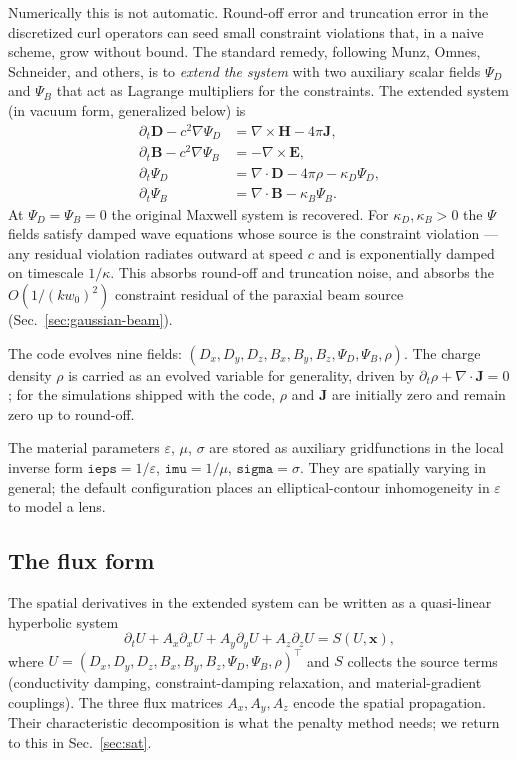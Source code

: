 \documentclass[11pt]{article}
\newcommand{\vE}{\mathbf{E}}
\newcommand{\vB}{\mathbf{B}}
\newcommand{\vD}{\mathbf{D}}
\newcommand{\vH}{\mathbf{H}}
\newcommand{\vJ}{\mathbf{J}}
\newcommand{\vx}{\mathbf{x}}
\newcommand{\eps}{\varepsilon}
\begin{document}
Numerically this is not automatic. Round-off error and truncation error
in the discretized curl operators can seed small constraint violations
that, in a naive scheme, grow without bound. The standard remedy,
following Munz, Omnes, Schneider, and others, is to \emph{extend the
system} with two auxiliary scalar fields $\Psi_D$ and $\Psi_B$ that
act as Lagrange multipliers for the constraints. The extended system
(in vacuum form, generalized below) is
\begin{align}
  \partial_t \vD - c^2 \nabla \Psi_D &= \nabla \times \vH - 4\pi \vJ, \\
  \partial_t \vB - c^2 \nabla \Psi_B &= -\nabla \times \vE, \\
  \partial_t \Psi_D &= \nabla \cdot \vD - 4\pi \rho - \kappa_D \Psi_D, \\
  \partial_t \Psi_B &= \nabla \cdot \vB - \kappa_B \Psi_B.
\end{align}
At $\Psi_D = \Psi_B = 0$ the original Maxwell system is recovered.
For $\kappa_{D}, \kappa_{B} > 0$ the $\Psi$ fields satisfy damped wave
equations whose source is the constraint violation — any residual violation
radiates outward at speed $c$ and is exponentially damped on timescale
$1/\kappa$. This absorbs round-off and truncation noise, and absorbs
the $O(1/(k w_0)^2)$ constraint residual of the paraxial beam source
(Sec.~\ref{sec:gaussian-beam}).

The code evolves nine fields: $(D_x, D_y, D_z, B_x, B_y, B_z, \Psi_D, \Psi_B, \rho)$.
The charge density $\rho$ is carried as an evolved variable for generality,
driven by $\partial_t \rho + \nabla \cdot \vJ = 0$; for the simulations
shipped with the code, $\rho$ and $\vJ$ are initially zero and remain
zero up to round-off.

The material parameters $\eps$, $\mu$, $\sigma$ are stored as auxiliary
gridfunctions in the local inverse form $\mathtt{ieps} = 1/\eps$,
$\mathtt{imu} = 1/\mu$, $\mathtt{sigma} = \sigma$. They are spatially
varying in general; the default configuration places an
elliptical-contour inhomogeneity in $\eps$ to model a lens.

\subsection{The flux form}

The spatial derivatives in the extended system can be written as a
quasi-linear hyperbolic system
\begin{equation}
  \partial_t U + A_x \partial_x U + A_y \partial_y U + A_z \partial_z U
  = S(U, \vx),
  \label{eq:flux-form}
\end{equation}
where $U = (D_x, D_y, D_z, B_x, B_y, B_z, \Psi_D, \Psi_B, \rho)^\top$ and
$S$ collects the source terms (conductivity damping, constraint-damping
relaxation, and material-gradient couplings). The three flux matrices
$A_x, A_y, A_z$ encode the spatial propagation. Their
characteristic decomposition is what the penalty method needs; we return
to this in Sec.~\ref{sec:sat}.
\end{document}
